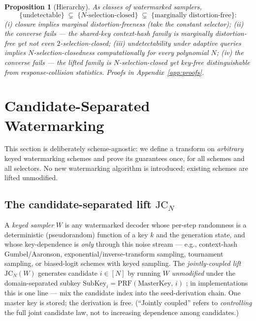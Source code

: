 \documentclass{article} %
\newtheorem{proposition}{Proposition}
\newcommand{\dftext}{distortion-free}
\begin{document}
\begin{proposition}[Hierarchy]\label{prop:hierarchy}
As classes of watermarked samplers,
\[
\{\text{undetectable}\}\;\subsetneq\;
\{\text{$N$-selection-closed}\}\;\subsetneq\;
\{\text{marginally \dftext}\}:
\]
(i) closure implies marginal \dftext{}ness (take the constant selector);
(ii) the converse fails --- the shared-key context-hash family is marginally
\dftext{} yet not even $2$-selection-closed;
(iii) undetectability under adaptive queries \citep{christ2023undetectable}
implies $N$-selection-closedness computationally for every polynomial $N$;
(iv) the converse fails --- the lifted family is $N$-selection-closed yet
key-free distinguishable from response-collision statistics. Proofs in
Appendix~\ref{app:proofs}.
\end{proposition}

\section{Candidate-Separated Watermarking}\label{sec:method}
This section is deliberately scheme-agnostic: we define a transform on
\emph{arbitrary} keyed watermarking schemes and prove its guarantees once, for
all schemes and all selectors. No new watermarking algorithm is introduced;
existing schemes are lifted unmodified.

\subsection{The candidate-separated lift $\mathrm{JC}_N$}
A \emph{keyed sampler} $W$ is any watermarked decoder whose per-step
randomness is a deterministic (pseudorandom) function of a key $k$ and the
generation state, and whose key-dependence is \emph{only} through this noise
stream --- e.g., context-hash Gumbel/Aaronson, exponential/inverse-transform
sampling, tournament sampling, or biased-logit schemes with keyed sampling.
The \emph{jointly-coupled lift} $\mathrm{JC}_N(W)$ generates candidate
$i\in[N]$ by running $W$ \emph{unmodified} under the domain-separated subkey
$\mathrm{SubKey}_i=\mathrm{PRF}(\mathrm{MasterKey},\,i)$ \citep{ggm1986}; in implementations
this is one line --- mix the candidate index into the seed-derivation chain.
One master key is stored; the derivation is free. (``Jointly coupled'' refers
to \emph{controlling} the full joint candidate law, not to increasing
dependence among candidates.)
\end{document}
